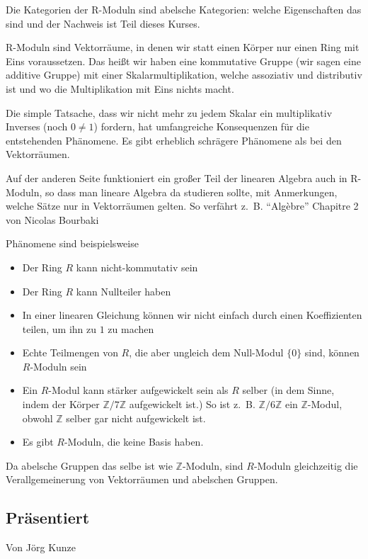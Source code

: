 \documentclass[a4paper]{amsart}
\theoremstyle{definition}
\newcommand{\Z}{\ensuremath{\mathbb{ Z }}}
\newcommand{\zz}[1]{\ensuremath{\Z /#1\Z}}
\newcommand{\zb}{z.~B. }
\begin{document}
Die Kategorien der R-Moduln sind abelsche Kategorien: welche Eigenschaften das sind und der Nachweis ist Teil dieses Kurses.

R-Moduln sind Vektorräume, in denen wir statt einen Körper nur einen Ring mit Eins voraussetzen. Das heißt wir haben eine kommutative Gruppe (wir sagen eine additive Gruppe) mit einer Skalarmultiplikation, welche assoziativ und distributiv ist und wo die Multiplikation mit Eins nichts macht.

Die simple Tatsache, dass wir nicht mehr zu jedem Skalar ein multiplikativ Inverses (noch $0 \ne 1$) fordern, hat umfangreiche Konsequenzen für die entstehenden Phänomene. Es gibt erheblich schrägere Phänomene als bei den Vektorräumen.

Auf der anderen Seite funktioniert ein großer Teil der linearen Algebra auch in R-Moduln, so dass man lineare Algebra da studieren sollte, mit Anmerkungen, welche Sätze nur in Vektorräumen gelten. So verfährt \zb "`Algèbre"' Chapitre 2 von Nicolas Bourbaki \cite{A1-3}

Phänomene sind beispielsweise
\begin{itemize}
   \item Der Ring $R$ kann nicht-kommutativ sein
   \item Der Ring $R$ kann Nullteiler haben
   \item In einer linearen Gleichung können wir nicht einfach durch einen Koeffizienten teilen, um ihn zu $1$ zu machen
   \item Echte Teilmengen von $R$, die aber ungleich dem Null-Modul $\{0\}$ sind, können $R$-Moduln sein
   \item Ein $R$-Modul kann stärker aufgewickelt sein als $R$ selber (in dem Sinne, indem der Körper \zz7 aufgewickelt ist.) So ist \zb $\Z / 6 \Z$ ein $\Z$-Modul, obwohl $\Z$ selber gar nicht aufgewickelt ist.
   \item Es gibt $R$-Moduln, die keine Basis haben.
\end{itemize}

Da abelsche Gruppen das selbe ist wie $\Z$-Moduln, sind $R$-Moduln gleichzeitig die Verallgemeinerung von Vektorräumen und abelschen Gruppen.

\subsection*{Präsentiert}
Von Jörg Kunze
\end{document}
